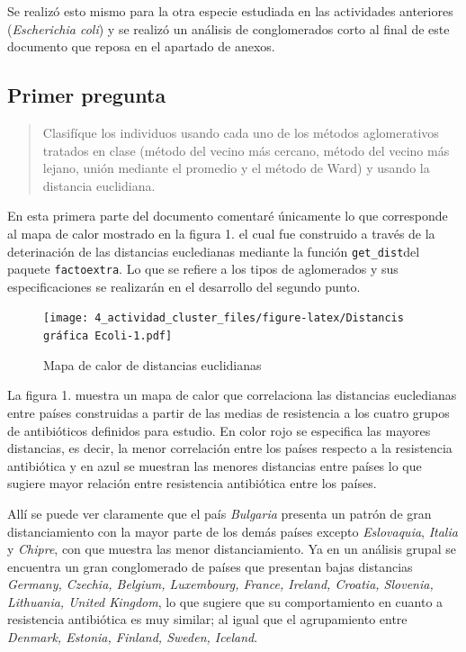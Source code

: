 \documentclass[
]{article}
\begin{document}
Se realizó esto mismo para la otra especie estudiada en las actividades
anteriores (\emph{Escherichia coli}) y se realizó un análisis de
conglomerados corto al final de este documento que reposa en el apartado
de anexos.

\hypertarget{primer-pregunta}{%
\subsection{Primer pregunta}\label{primer-pregunta}}

\begin{quote}
Clasifíque los individuos usando cada uno de los métodos aglomerativos
tratados en clase (método del vecino más cercano, método del vecino más
lejano, unión mediante el promedio y el método de Ward) y usando la
distancia euclidiana.
\end{quote}

En esta primera parte del documento comentaré únicamente lo que
corresponde al mapa de calor mostrado en la figura 1. el cual fue
construido a través de la deterinación de las distancias eucledianas
mediante la función \texttt{get\_dist}del paquete \texttt{factoextra}.
Lo que se refiere a los tipos de aglomerados y sus especificaciones se
realizarán en el desarrollo del segundo punto.

\begin{figure}
\centering
\texttt{[image: 4\_actividad\_cluster\_files/figure-latex/Distancis gráfica Ecoli-1.pdf]}
\caption{Mapa de calor de distancias euclidianas}
\end{figure}

La figura 1. muestra un mapa de calor que correlaciona las distancias
eucledianas entre países construidas a partir de las medias de
resistencia a los cuatro grupos de antibióticos definidos para estudio.
En color rojo se especifica las mayores distancias, es decir, la menor
correlación entre los países respecto a la resistencia antibiótica y en
azul se muestran las menores distancias entre países lo que sugiere
mayor relación entre resistencia antibiótica entre los países.

Allí se puede ver claramente que el país \emph{Bulgaria} presenta un
patrón de gran distanciamiento con la mayor parte de los demás países
excepto \emph{Eslovaquia}, \emph{Italia} y \emph{Chipre}, con que
muestra las menor distanciamiento. Ya en un análisis grupal se encuentra
un gran conglomerado de países que presentan bajas distancias
\emph{Germany, Czechia, Belgium, Luxembourg, France, Ireland, Croatia,
Slovenia, Lithuania, United Kingdom}, lo que sugiere que su
comportamiento en cuanto a resistencia antibiótica es muy similar; al
igual que el agrupamiento entre \emph{Denmark, Estonia, Finland, Sweden,
Iceland}.
\end{document}
